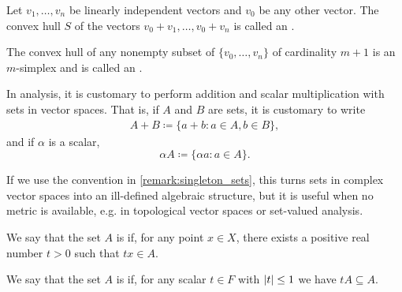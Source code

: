 \begin{definition}\label{def:simplex}
  Let \( v_1, \ldots, v_n \) be linearly independent vectors and \( v_0 \) be any other vector. The convex hull \( S \) of the vectors \( v_0 + v_1, \ldots, v_0 + v_n \) is called an .

  The convex hull of any nonempty subset of \( \{ v_0, \ldots, v_n \} \) of cardinality \( m + 1 \) is an \( m \)-simplex and is called an .
\end{definition}

\begin{remark}\label{remark:vector_space_set_operations}
  In analysis, it is customary to perform addition and scalar multiplication with sets in vector spaces. That is, if \( A \) and \( B \) are sets, it is customary to write
  \begin{align*}
    A + B \coloneqq \{ a + b \colon a \in A, b \in B \},
  \end{align*}
  and if \( \alpha \) is a scalar,
  \begin{equation*}
    \alpha A \coloneqq \{ \alpha a \colon a \in A \}.
  \end{equation*}

  If we use the convention in \cref{remark:singleton_sets}, this turns sets in complex vector spaces into an ill-defined algebraic structure, but it is useful when no metric is available, e.g. in topological vector spaces or set-valued analysis.
\end{remark}

\begin{definition}\label{def:absorbing_set}\cite[25]{Rudin1991}
  We say that the set \( A \) is  if, for any point \( x \in X \), there exists a positive real number \( t > 0 \) such that \( tx \in A \).
\end{definition}

\begin{definition}\label{def:balanced_set}\cite[6]{Rudin1991}
  We say that the set \( A \) is  if, for any scalar \( t \in F \) with \( \left\vert t \right\vert \leq 1 \) we have \( tA \subseteq A \).
\end{definition}

